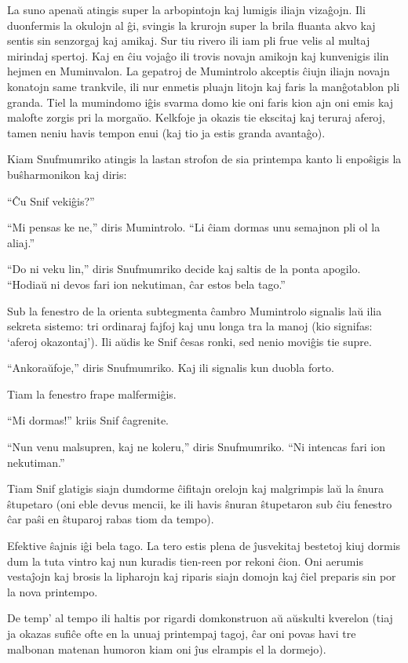 La suno apenaŭ atingis super la arbopintojn kaj lumigis iliajn vizaĝojn. Ili duonfermis la okulojn al ĝi, svingis la krurojn super la brila fluanta akvo kaj sentis sin senzorgaj kaj amikaj. Sur tiu rivero ili iam pli frue velis al multaj mirindaj spertoj. Kaj en ĉiu vojaĝo ili trovis novajn amikojn kaj kunvenigis ilin hejmen en Muminvalon. La gepatroj de Mumintrolo akceptis ĉiujn iliajn novajn konatojn same trankvile, ili nur enmetis pluajn litojn kaj faris la manĝotablon pli granda. Tiel la mumindomo iĝis svarma domo kie oni faris kion ajn oni emis kaj malofte zorgis pri la morgaŭo. Kelkfoje ja okazis tie ekscitaj kaj teruraj aferoj, tamen neniu havis tempon enui (kaj tio ja estis granda avantaĝo).

Kiam Snufmumriko atingis la lastan strofon de sia printempa kanto li enpoŝigis la buŝharmonikon kaj diris:

``Ĉu Snif vekiĝis?''

``Mi pensas ke ne,'' diris Mumintrolo. ``Li ĉiam dormas unu semajnon pli ol la aliaj.''

``Do ni veku lin,'' diris Snufmumriko decide kaj saltis de la ponta apogilo. ``Hodiaŭ ni devos fari ion nekutiman, ĉar estos bela tago.''

Sub la fenestro de la orienta subtegmenta ĉambro Mumintrolo signalis laŭ ilia sekreta sistemo: tri ordinaraj fajfoj kaj unu longa tra la manoj (kio signifas: `aferoj okazontaj'). Ili aŭdis ke Snif ĉesas ronki, sed nenio moviĝis tie supre.

``Ankoraŭfoje,'' diris Snufmumriko. Kaj ili signalis kun duobla forto.

Tiam la fenestro frape malfermiĝis.

``Mi dormas!'' kriis Snif ĉagrenite.

``Nun venu malsupren, kaj ne koleru,'' diris Snufmumriko. ``Ni intencas fari ion nekutiman.''

Tiam Snif glatigis siajn dumdorme ĉifitajn orelojn kaj malgrimpis laŭ la ŝnura ŝtupetaro (oni eble devus mencii, ke ili havis ŝnuran ŝtupetaron sub ĉiu fenestro ĉar paŝi en ŝtuparoj rabas tiom da tempo).

Efektive ŝajnis iĝi bela tago. La tero estis plena de ĵusvekitaj bestetoj kiuj dormis dum la tuta vintro kaj nun kuradis tien-reen por rekoni ĉion. Oni aerumis vestaĵojn kaj brosis la lipharojn kaj riparis siajn domojn kaj ĉiel preparis sin por la nova printempo.

De temp' al tempo ili haltis por rigardi domkonstruon aŭ aŭskulti kverelon (tiaj ja okazas sufiĉe ofte en la unuaj printempaj tagoj, ĉar oni povas havi tre malbonan matenan humoron kiam oni ĵus elrampis el la dormejo).

